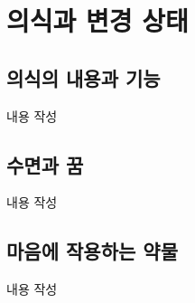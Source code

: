 \section{의식과 변경 상태}

\subsection{의식의 내용과 기능}
내용 작성

\subsection{수면과 꿈}
내용 작성

\subsection{마음에 작용하는 약물}
내용 작성
